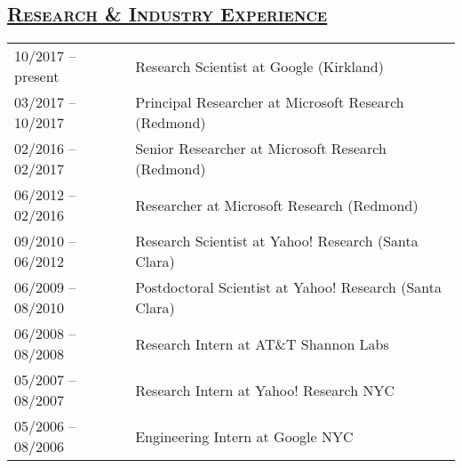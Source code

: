 \documentclass[10pt,twoside,letterpaper]{article}
\newcommand{\tabrowsep}{\vspace{1mm}}
\begin{document}
\subsection*{\textsc{\underline{Research \& Industry Experience}}}

\begin{tabular}{p{30mm} p{120mm}}
10/2017 -- present & Research Scientist at Google (Kirkland) \\
03/2017 -- 10/2017 & Principal Researcher at Microsoft Research (Redmond) \\
02/2016 -- 02/2017 & Senior Researcher at Microsoft Research  (Redmond) \\
06/2012 -- 02/2016 & Researcher at Microsoft Research (Redmond) \\
09/2010 -- 06/2012 & Research Scientist at Yahoo! Research (Santa Clara) \\
06/2009 -- 08/2010 & Postdoctoral Scientist at Yahoo! Research (Santa Clara) \\
06/2008 -- 08/2008 & Research Intern at AT\&T Shannon Labs \\
05/2007 -- 08/2007 & Research Intern at Yahoo! Research NYC \\
05/2006 -- 08/2006 & Engineering Intern at Google NYC \\

\end{tabular}
\end{document}

